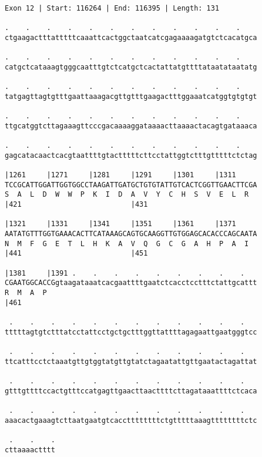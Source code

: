 \documentclass{article}
\begin{document}
\begin{Verbatim}[fontfamily=courier]
Exon 12 | Start: 116264 | End: 116395 | Length: 131

.    .    .    .    .    .    .    .    .    .    .    .    
ctgaagactttatttttcaaattcactggctaatcatcgagaaaagatgtctcacatgca

.    .    .    .    .    .    .    .    .    .    .    .    
catgctcataaagtgggcaatttgtctcatgctcactattatgttttataatataatatg

.    .    .    .    .    .    .    .    .    .    .    .    
tatgagttagtgtttgaattaaagacgttgtttgaagactttggaaatcatggtgtgtgt

.    .    .    .    .    .    .    .    .    .    .    .    
ttgcatggtcttagaaagttcccgacaaaaggataaaacttaaaactacagtgataaaca

.    .    .    .    .    .    .    .    .    .    .    .    
gagcatacaactcacgtaattttgtactttttcttcctattggtctttgtttttctctag

|1261     |1271     |1281     |1291     |1301     |1311     
TCCGCATTGGATTGGTGGCCTAAGATTGATGCTGTGTATTGTCACTCGGTTGAACTTCGA
S  A  L  D  W  W  P  K  I  D  A  V  Y  C  H  S  V  E  L  R  
|421                          |431                          

|1321     |1331     |1341     |1351     |1361     |1371     
AATATGTTTGGTGAAACACTTCATAAAGCAGTGCAAGGTTGTGGAGCACACCCAGCAATA
N  M  F  G  E  T  L  H  K  A  V  Q  G  C  G  A  H  P  A  I  
|441                          |451                          

|1381     |1391 .    .    .    .    .    .    .    .    .   
CGAATGGCACCGgtaagataaatcacgaattttgaatctcacctcctttctattgcattt
R  M  A  P                                                  
|461                                                        

 .    .    .    .    .    .    .    .    .    .    .    .   
tttttagtgtctttatcctattcctgctgctttggttattttagagaattgaatgggtcc

 .    .    .    .    .    .    .    .    .    .    .    .   
ttcatttcctctaaatgttgtggtatgttgtatctagaatattgttgaatactagattat

 .    .    .    .    .    .    .    .    .    .    .    .   
gtttgttttccactgtttccatgagttgaacttaacttttcttagataaattttctcaca

 .    .    .    .    .    .    .    .    .    .    .    .   
aaacactgaaagtcttaatgaatgtcaccttttttttctgtttttaaagttttttttctc

 .    .    .
cttaaaactttt
\end{Verbatim}
\newpage
\end{document}
